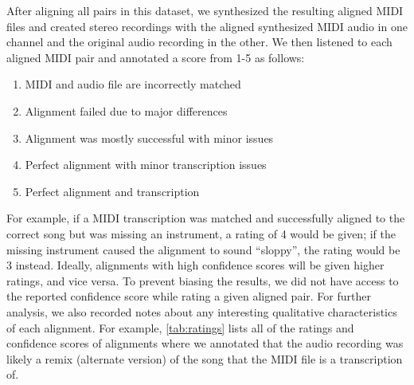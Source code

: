 After aligning all pairs in this dataset, we synthesized the resulting aligned MIDI files and created stereo recordings with the aligned synthesized MIDI audio in one channel and the original audio recording in the other.
We then listened to each aligned MIDI pair and annotated a score from 1-5 as follows:
\begin{enumerate}
\item MIDI and audio file are incorrectly matched
\item Alignment failed due to major differences
\item Alignment was mostly successful with minor issues
\item Perfect alignment with minor transcription issues
\item Perfect alignment and transcription
\end{enumerate}
For example, if a MIDI transcription was matched and successfully aligned to the correct song but was missing an instrument, a rating of 4 would be given; if the missing instrument caused the alignment to sound ``sloppy'', the rating would be 3 instead.
Ideally, alignments with high confidence scores will be given higher ratings, and vice versa.
To prevent biasing the results, we did not have access to the reported confidence score while rating a given aligned pair.
For further analysis, we also recorded notes about any interesting qualitative characteristics of each alignment.
For example, \cref{tab:ratings} lists all of the ratings and confidence scores of alignments where we annotated that the audio recording was likely a remix (alternate version) of the song that the MIDI file is a transcription of.

